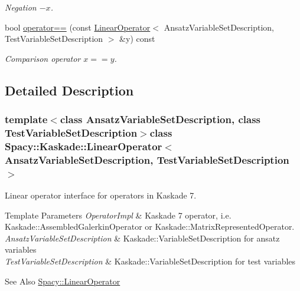 \begin{DoxyCompactItemize}
\begin{DoxyCompactList}\small\item\em Negation $ -x$. \end{DoxyCompactList}\item 
bool \hyperlink{classSpacy_1_1AddArithmeticOperators_a5ff1909f49f4a705d69663dc2d4b6316}{operator==} (const \hyperlink{classSpacy_1_1Kaskade_1_1LinearOperator}{Linear\-Operator}$<$ Ansatz\-Variable\-Set\-Description, Test\-Variable\-Set\-Description $>$ \&y) const
\begin{DoxyCompactList}\small\item\em Comparison operator $ x==y$. \end{DoxyCompactList}\end{DoxyCompactItemize}


\subsection{Detailed Description}
\subsubsection*{template$<$class Ansatz\-Variable\-Set\-Description, class Test\-Variable\-Set\-Description$>$class Spacy\-::\-Kaskade\-::\-Linear\-Operator$<$ Ansatz\-Variable\-Set\-Description, Test\-Variable\-Set\-Description $>$}

Linear operator interface for operators in Kaskade 7. 


\begin{DoxyTemplParams}{Template Parameters}
{\em Operator\-Impl} & Kaskade 7 operator, i.\-e. Kaskade\-::\-Assembled\-Galerkin\-Operator or Kaskade\-::\-Matrix\-Represented\-Operator. \\
\hline
{\em Ansatz\-Variable\-Set\-Description} & Kaskade\-::\-Variable\-Set\-Description for ansatz variables \\
\hline
{\em Test\-Variable\-Set\-Description} & Kaskade\-::\-Variable\-Set\-Description for test variables \\
\hline
\end{DoxyTemplParams}
\begin{DoxySeeAlso}{See Also}
\hyperlink{classSpacy_1_1LinearOperator}{Spacy\-::\-Linear\-Operator} 
\end{DoxySeeAlso}


